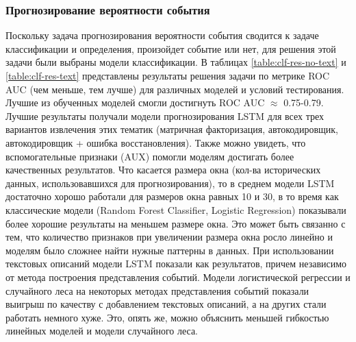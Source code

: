 \subsubsection{Прогнозирование вероятности события}
Поскольку задача прогнозирования вероятности события сводится к задаче классификации и определения, произойдет событие или нет, для решения этой задачи были выбраны модели классификации.
В таблицах \ref{table:clf-res-no-text} и \ref{table:clf-res-text} представлены результаты решения задачи по метрике ROC AUC (чем меньше, тем лучше) для различных моделей и условий тестирования. Лучшие из обученных моделей смогли достигнуть ROC AUC $\approx$ 0.75-0.79. Лучшие результаты получали модели прогнозирования LSTM для всех трех вариантов извлечения этих тематик (матричная факторизация, автокодировщик, автокодировщик + ошибка восстановления). Также можно увидеть, что вспомогательные признаки (AUX) помогли моделям достигать более качественных результатов. Что касается размера окна (кол-ва исторических данных, использовавшихся для прогнозирования), то в среднем модели LSTM достаточно хорошо работали для размеров окна равных 10 и 30, в то время как классические модели (Random Forest Classifier, Logistic Regression) показывали более хорошие результаты на меньшем размере окна. Это может быть связанно с тем, что количество признаков при увеличении размера окна росло линейно и моделям было сложнее найти нужные паттерны в данных.
При использовании текстовых описаний модели LSTM показали как результатов, причем независимо от метода построения представления событий. Модели логистической регрессии и случайного леса на некоторых методах представления событий показали выигрыш по качеству с добавлением текстовых описаний, а на других стали работать немного хуже. Это, опять же, можно объяснить меньшей гибкостью линейных моделей и модели случайного леса.

